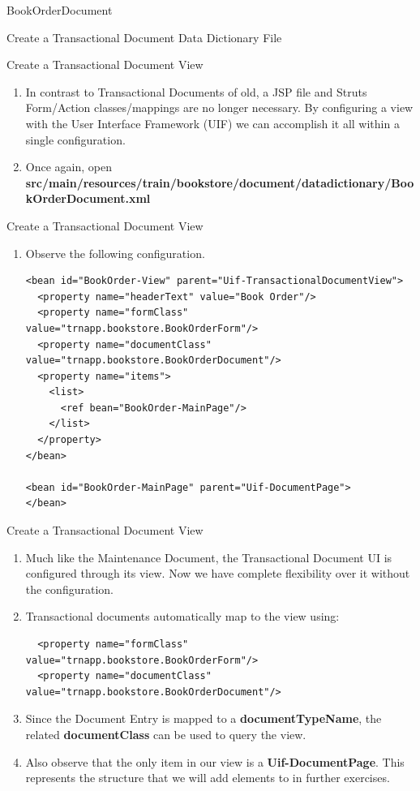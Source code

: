 \documentclass[xcolor=dvipsnames,14pt,professionalfonts]{beamer}
\begin{document}
\begin{frame}{BookOrderDocument}
\begin{enumerate}
\begin{frame}{Create a Transactional Document Data Dictionary File}
\begin{frame}{Create a Transactional Document View}
  \begin{enumerate}
  \item In contrast to Transactional Documents of old, a JSP file and
    Struts Form/Action classes/mappings are no longer necessary. By
    configuring a view with the User Interface Framework (UIF) we can
    accomplish it all within a single configuration.
  \item Once again, open \textbf{src/main/resources/train/bookstore/document/datadictionary/BookOrderDocument.xml}
    \end{enumerate}
  \end{frame}

\begin{frame}{Create a Transactional Document View}
  \begin{enumerate}
    \item Observe the following configuration.
    \begin{verbatim}
<bean id="BookOrder-View" parent="Uif-TransactionalDocumentView">
  <property name="headerText" value="Book Order"/>
  <property name="formClass" value="trnapp.bookstore.BookOrderForm"/>
  <property name="documentClass" value="trnapp.bookstore.BookOrderDocument"/>
  <property name="items">
    <list>
      <ref bean="BookOrder-MainPage"/>
    </list>
  </property>
</bean>

<bean id="BookOrder-MainPage" parent="Uif-DocumentPage">
</bean>
\end{verbatim}
  \end{enumerate}
  \end{frame}

\begin{frame}{Create a Transactional Document View}
  \begin{enumerate}
  \item Much like the Maintenance Document, the Transactional Document
    UI is configured through its view. Now we have complete
    flexibility over it without the configuration.
  \item Transactional documents automatically map to the view using:
    \begin{verbatim}
  <property name="formClass" value="trnapp.bookstore.BookOrderForm"/>
  <property name="documentClass" value="trnapp.bookstore.BookOrderDocument"/>
  \end{verbatim}
\item Since the Document Entry is mapped to a
  \textbf{documentTypeName}, the related \textbf{documentClass} can be
  used to query the view.
  \item Also observe that the only item in our view is a
    \textbf{Uif-DocumentPage}. This represents the structure that we
    will add elements to in further exercises.
  \end{enumerate}
\end{frame}


\end{frame}
\end{enumerate}
\end{frame}
\end{document}
